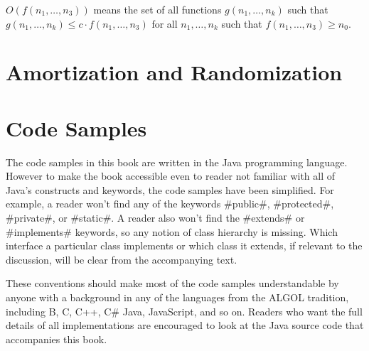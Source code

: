$O(f(n_1,\ldots,n_3))$ means the set of all functions $g(n_1,\ldots,n_k)$ such that
$g(n_1,\ldots,n_k) \le c\cdot f(n_1,\ldots,n_3)$
for all $n_1,\ldots,n_k$ such that $f(n_1,\ldots,n_3)\ge n_0$.


\section{Amortization and Randomization}

\section{Code Samples}

The code samples in this book are written in the Java programming
language.  However to make the book accessible even to reader not
familiar with all of Java's constructs and keywords, the code samples have
been simplified.  For example, a reader won't find any of the keywords
#public#, #protected#, #private#, or #static#.  A reader also won't
find the #extends# or #implements# keywords, so any notion of class
hierarchy is missing.  Which interface a particular class implements
or which class it extends, if relevant to the discussion, will be clear
from the accompanying text.

These conventions should make most of the code samples understandable by
anyone with a background in any of the languages from the ALGOL tradition,
including B, C, C++, C\# Java, JavaScript, and so on.  Readers who want
the full details of all implementations are encouraged to look at the
Java source code that accompanies this book.


